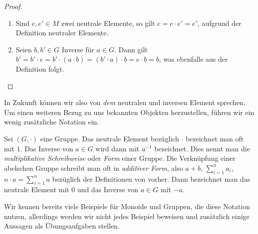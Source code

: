 {\begin{proof}
  \begin{enumerate}
    \item Sind $e,e' \in M$ zwei neutrale Elemente, so gilt $e = e \cdot e' = e'$, aufgrund der Definition neutraler Elemente.
    \item Seien $b,b' \in G$ Inverse für $a \in G$. Dann gilt $b' = b' \cdot e = b' \cdot (a \cdot b) = (b' \cdot a) \cdot b = e \cdot b = b$, was ebenfalls aus der Definition folgt.
  \end{enumerate}
\end{proof}

In Zukunft können wir also von \textit{dem} neutralen und inversen Element sprechen. Um einen weiteren Bezug zu uns bekannten Objekten herzustellen, führen wir ein wenig zusätzliche Notation ein.

\begin{notation}
Sei $(G,\cdot)$ eine Gruppe. Das neutrale Element bezüglich $\cdot$ bezeichnet man oft mit $1$. Das Inverse von $a \in G$ wird dann mit $a^{-1}$ bezeichnet. Dies nennt man die \emph{multiplikative Schreibweise} oder \emph{Form} einer Gruppe.
Die Verknüpfung einer abelschen Gruppe schreibt man oft in \emph{additiver Form}, also $a+b$, $\sum_{i=1}^n a_i$, $n \cdot a = \sum_{i=1}^n a$ bezüglich der Definitionen von vorher. Dann bezeichnet man das neutrale Element mit $0$ und das Inverse von $a \in G$ mit $-a$.
\end{notation}

Wir kennen bereits viele Beispiele für Monoide und Gruppen, die diese Notation nutzen, allerdings werden wir nicht jedes Beispiel beweisen und zusätzlich einige Aussagen als Übungsaufgaben stellen.

}
